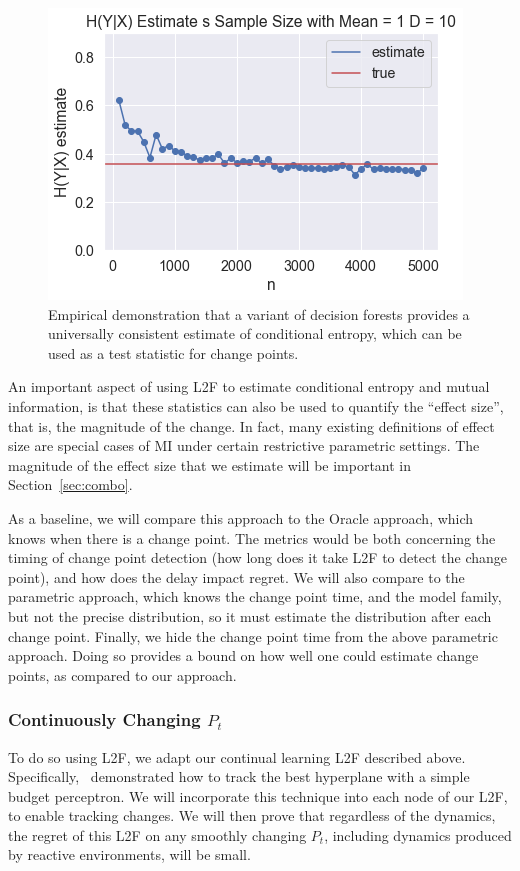 \documentclass{article}
\begin{document}
\begin{figure}
    \centering
    \includegraphics{cond_entropy.png}
    \caption{Empirical demonstration that a variant of decision forests provides a universally consistent estimate of conditional entropy, which can be used as a test statistic for change points.}
    \label{fig:cond_entropy}
\end{figure}

An important aspect of using L2F to estimate conditional entropy and mutual information, is that these statistics can also be used to quantify the ``effect size'', that is, the magnitude of the change.  In fact, many existing definitions of effect size are special cases of MI under certain restrictive parametric settings.  The magnitude of the effect size that we estimate will be important in Section~\ref{sec:combo}.


As a baseline, we will compare this approach to the Oracle approach, which knows when there is a change point.  The metrics would be both concerning the timing of change point detection (how long does it take L2F to detect the change point), and how does the delay impact regret. We will also compare to the parametric approach, which knows the change point time, and the model family, but not the precise distribution, so it must estimate the distribution after each change point. Finally, we hide the change point time from the above parametric approach. Doing so provides a bound on how well one could estimate change points, as compared to our approach. 

\subsubsection{Continuously Changing $P_t$}

To do so using L2F, we adapt our continual learning L2F described above.  Specifically,~\citet{Cavallanti2007} demonstrated how to track the best hyperplane with a simple budget perceptron.  We will incorporate this technique into each node of our L2F, to enable tracking changes. We will then prove that regardless of the dynamics, the regret of this L2F on any smoothly changing $P_t$, including dynamics produced by reactive environments, will be small.  
\end{document}
